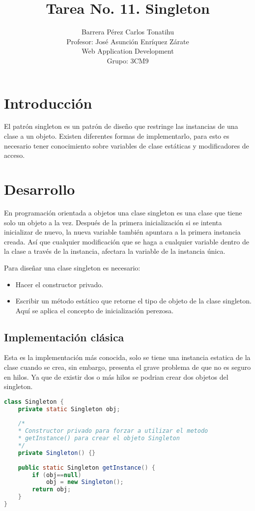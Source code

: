 \documentclass[a4paper,12pt]{article}
\title{Tarea No. 11. Singleton}
\author{Barrera Pérez Carlos Tonatihu \\ Profesor: José Asunción Enríquez 
Zárate \\ Web Application Development \\ Grupo: 3CM9 }
\begin{document}
\maketitle
\newpage
\tableofcontents
\newpage

\section{Introducción}
El patrón singleton es un patrón de diseño que restringe las instancias de una 
clase a un objeto. Existen diferentes formas de implementarlo, para esto es 
necesario tener conocimiento sobre variables de clase estáticas y modificadores 
de acceso.

\section{Desarrollo}
En programación orientada a objetos una clase singleton es una clase que tiene 
solo un objeto a la vez. Después de la primera inicialización si se intenta 
inicializar de nuevo, la nueva variable también apuntara a la primera instancia 
creada. Así que cualquier modificación que se haga a cualquier variable dentro 
de la clase a través de la instancia, afectara la variable de la instancia 
única.

Para diseñar una clase singleton es necesario:
\begin{itemize}
 \item Hacer el constructor privado.
 \item Escribir un método estático que retorne el tipo de objeto de la clase 
singleton. Aquí se aplica el concepto de inicialización perezosa.
\end{itemize}

\subsection{Implementación clásica}
Esta es la implementación más conocida, solo se tiene una instancia estatica 
de la clase cuando se crea, sin embargo, presenta el grave problema de que no 
es seguro en hilos. Ya que de existir dos o más hilos se podrian crear dos 
objetos del singleton.

\begin{lstlisting}[language=Java,style=customJava,basicstyle=\fontfamily{cmss}
\small]
class Singleton { 
    private static Singleton obj; 
 
    /*
    * Constructor privado para forzar a utilizar el metodo
    * getInstance() para crear el objeto Singleton
    */
    private Singleton() {} 
  
    public static Singleton getInstance() { 
        if (obj==null) 
            obj = new Singleton(); 
        return obj; 
    } 
}
\end{lstlisting}
\end{document}
